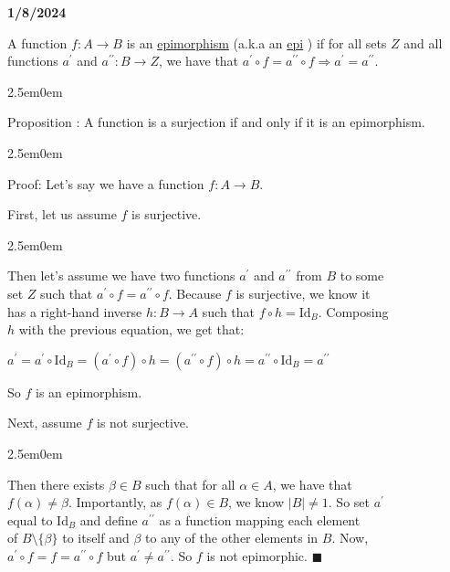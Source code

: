 \documentclass{book}
\newcommand{\hOne}{%
   \color{Black}%
   \fontsize{14}{16}\selectfont%
}
\newcommand{\hTwo}{%
   \color{MidnightBlue}%
   \fontsize{13}{15}\selectfont%
}
\newcommand{\hThree}{%
   \color{PineGreen!85!Orange}
   \fontsize{13}{15}\selectfont%
}
\newenvironment{myIndent}{%
   \begin{adjustwidth}{2.5em}{0em}%
}{%
   \end{adjustwidth}%
}
\newcommand{\udefine}[1]{{%
   \setulcolor{Red}%
   \setul{0.14em}{0.07em}%
   \ul{#1}%
}}
\newcommand*{\markDate}[1]{%
   {\huge \color{Black} \textbf{#1} \newline}%
}
\newcommand{\pprime}{{\prime\prime}}
\newcommand{\myId}{\mathrm{Id}}
\newcounter{PropNumber}
\newcommand{\propCount}{%
   \stepcounter{PropNumber}%
   \thePropNumber%
}
\newcommand{\retTwo}{\hfill\bigbreak}
\begin{document}
   \markDate{1/8/2024}

   \hOne
   A function $f: A \rightarrow B$ is an \udefine{epimorphism} 
   (a.k.a an \udefine{epi}) if for all sets $Z$ and all\\ functions $a^{\prime}$
   and $a^{\pprime}: B \rightarrow Z$, we have that 
   $a^{\prime} \circ f = a^{\pprime} \circ f \Rightarrow 
   a^{\prime} = a^{\pprime}$.

   
   \begin{myIndent}
      \hTwo
      Proposition \propCount: A function is a surjection if and
      only if it is an epimorphism.
      
      \hThree
      \begin{myIndent}
         Proof: Let's say we have a function $f: A \rightarrow B$.
         \hfill \bigbreak

         First, let us assume $f$ is surjective.
         \begin{myIndent}
               Then let's assume we have two functions $a^\prime$ and $a^\pprime$ from $B$ to some\\ set $Z$ such that $a^\prime \circ f = a^\pprime \circ f$. Because $f$ is surjective, we know it\\ has a right-hand inverse $h: B \rightarrow A$ such that $f \circ h = \myId_B$. Composing\\ $h$ with the previous equation, we get that:

               {\center $a^{\prime} = a^{\prime} \circ \myId_B = (a^\prime \circ f) \circ h = (a^\pprime \circ f) \circ h = a^\pprime \circ \myId_B = a^\pprime$\retTwo\par}

               So $f$ is an epimorphism.\retTwo
         \end{myIndent}

         Next, assume $f$ is not surjective.
         \begin{myIndent}
            Then there exists $\beta \in B$ such that for all $\alpha \in A$, we have that\\ $f(\alpha) \neq \beta$. Importantly, as $f(\alpha) \in B$, we know $|B| \neq 1$. So set $a^\prime$\\ equal to $\myId_B$ and define $a^\pprime$ as a function mapping each element\\ of $B \setminus \{\beta \}$ to itself and $\beta$ to any of the other elements in $B$. Now,\\
            $a^\prime \circ f = f = a^\pprime \circ f$ but $a^\prime \neq a^\pprime$. So $f$ is not epimorphic. $\blacksquare$\retTwo
         \end{myIndent}
      \end{myIndent}
   \end{myIndent}
\end{document}
